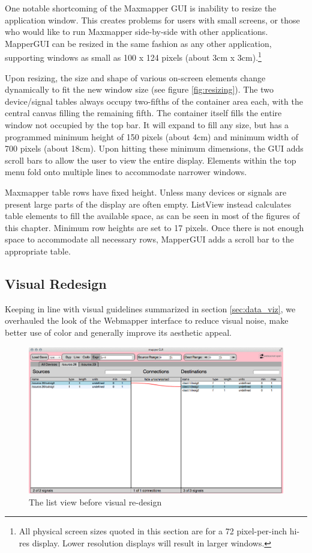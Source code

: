One notable shortcoming of the Maxmapper GUI is inability to resize the application window. This creates problems for users with small screens, or those who would like to run Maxmapper side-by-side with other applications. MapperGUI can be resized in the same fashion as any other application, supporting windows as small as 100 x 124 pixels (about 3cm x 3cm).\footnote{All physical screen sizes quoted in this section are for a 72 pixel-per-inch hi-res display. Lower resolution displays will result in larger windows.}

Upon resizing, the size and shape of various on-screen elements change dynamically to fit the new window size (see figure \ref{fig:resizing}). The two device/signal tables always occupy two-fifths of the container area each, with the central canvas filling the remaining fifth. The container itself fills the entire window not occupied by the top bar. It will expand to fill any size, but has a programmed minimum height of 150 pixels (about 4cm) and minimum width of 700 pixels (about 18cm). Upon hitting these minimum dimensions, the GUI adds scroll bars to allow the user to view the entire display. Elements within the top menu fold onto multiple lines to accommodate narrower windows.


Maxmapper table rows have fixed height. Unless many devices or signals are present large parts of the display are often empty. ListView instead calculates table elements to fill the available space, as can be seen in most of the figures of this chapter. Minimum row heights are set to 17 pixels. Once there is not enough space to accommodate all necessary rows, MapperGUI adds a scroll bar to the appropriate table. 


	\subsection{Visual Redesign} %
	\label{sec:visual_redesign}

Keeping in line with visual guidelines summarized in section \ref{sec:data_viz}, we overhauled the look of the Webmapper interface to reduce visual noise, make better use of color and generally improve its aesthetic appeal. 

\begin{figure}[h]
\centering
	\includegraphics[width=\textwidth]{figures/before_redesign}
\caption{The list view before visual re-design}
\label{fig:before_redesign}
\end{figure}

